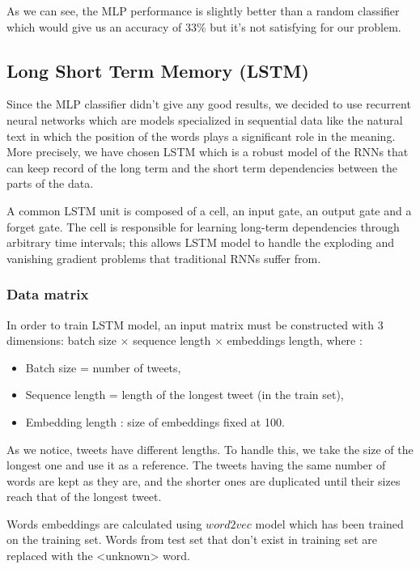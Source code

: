 \documentclass[a4paper,english,12pt]{article}
\begin{document}
As we can see, the MLP performance is slightly better than a random classifier which would give us an accuracy of 33\% but it's not satisfying for our problem. 

\subsection{Long Short Term Memory (LSTM)}
Since the MLP classifier didn't give any good results, we decided to use recurrent neural networks which are models specialized in sequential data like the natural text in which the position of the words plays a significant role in the meaning. More precisely, we have chosen LSTM which is a robust model of the RNNs that can keep record of the long term and the short term dependencies between the parts of the data.

A common LSTM unit is composed of a cell, an input gate, an output gate and a forget gate. The cell is responsible for learning long-term dependencies through arbitrary time intervals; this allows LSTM model to handle the exploding and vanishing gradient problems that traditional RNNs suffer from. 

\subsubsection{Data matrix}

In order to train LSTM model, an input matrix must be constructed with 3 dimensions: batch size $\times$ sequence length $\times$ embeddings length, where :

\begin{itemize}
	\item Batch size = number of tweets,
	\item Sequence length = length of the longest tweet (in the train set),
	\item Embedding length : size of embeddings fixed at 100.
\end{itemize}

As we notice, tweets have different lengths. To handle this, we take the size of the longest one and use it as a reference. The tweets having the same number of words are kept as they are, and the shorter ones are duplicated until their sizes reach that of the longest tweet.

Words embeddings are calculated using $word2vec$ model which has been trained on the training set. Words from test set that don't exist in training set are replaced with the <unknown> word.
\end{document}
